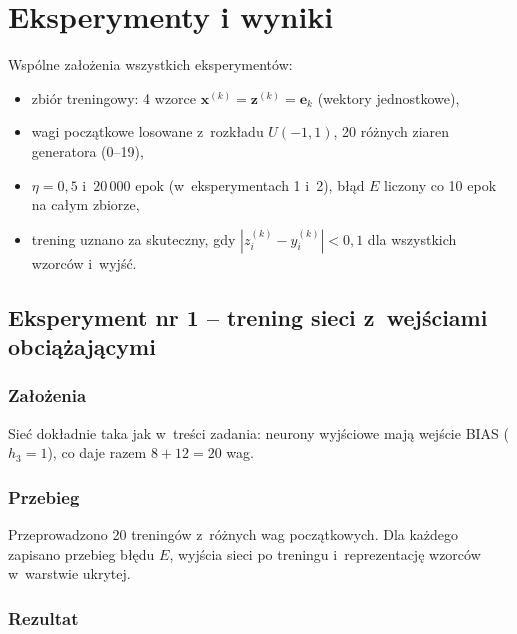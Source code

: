 \documentclass[12pt]{article}
\begin{document}
\section{Eksperymenty i wyniki}

Wspólne założenia wszystkich eksperymentów:
\begin{itemize}
 \item zbiór treningowy: 4 wzorce $\mathbf{x}^{(k)}=\mathbf{z}^{(k)}=\mathbf{e}_k$ (wektory jednostkowe),
 \item wagi początkowe losowane z~rozkładu $U(-1,1)$, 20 różnych ziaren generatora (0--19),
 \item $\eta = 0{,}5$ i~$20\,000$ epok (w~eksperymentach 1 i~2), błąd $E$ liczony co 10 epok
       na całym zbiorze,
 \item trening uznano za skuteczny, gdy $|z_i^{(k)}-y_i^{(k)}|<0{,}1$ dla wszystkich wzorców i~wyjść.
\end{itemize}


\subsection{Eksperyment nr 1 -- trening sieci z~wejściami obciążającymi}

\subsubsection{Założenia}

Sieć dokładnie taka jak w~treści zadania: neurony wyjściowe mają wejście BIAS ($h_3=1$),
co daje razem $8+12=20$ wag.

\subsubsection{Przebieg}

Przeprowadzono 20 treningów z~różnych wag początkowych. Dla każdego zapisano przebieg błędu $E$,
wyjścia sieci po treningu i~reprezentację wzorców w~warstwie ukrytej.

\subsubsection{Rezultat}
\end{document}

